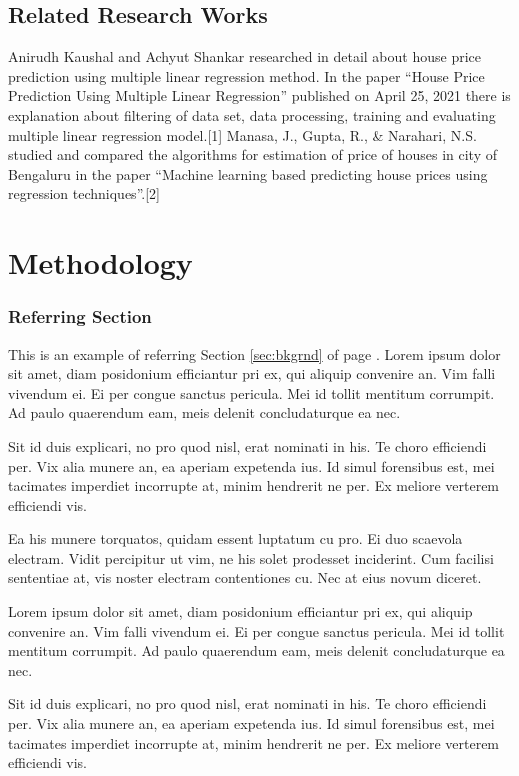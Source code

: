 \section{Related Research Works}
Anirudh Kaushal and Achyut Shankar researched in detail about house price prediction using multiple linear regression method. In the paper “House Price Prediction Using Multiple Linear Regression” published on April 25, 2021 there is explanation about filtering of data set, data processing, training and evaluating multiple linear regression model.[1]
Manasa, J., Gupta, R., \& Narahari, N.S. studied and compared the algorithms for estimation of price of houses in city of Bengaluru in the paper “Machine learning based predicting house prices using regression techniques”.[2]
\chapter{Methodology}

\subsection{Referring Section}
This is an example of referring Section \ref{sec:bkgrnd} of page \pageref{sec:bkgrnd}. Lorem ipsum dolor sit  amet, diam posidonium efficiantur pri ex, qui aliquip convenire an. Vim falli vivendum ei. Ei per congue sanctus pericula. Mei id tollit mentitum corrumpit. Ad paulo quaerendum eam, meis delenit concludaturque ea nec.\par
Sit id duis explicari, no pro quod nisl, erat nominati in his. Te choro efficiendi per. Vix alia munere an, ea aperiam expetenda ius. Id simul forensibus est, mei tacimates imperdiet incorrupte at, minim hendrerit ne per. Ex meliore verterem efficiendi vis.

Ea his munere torquatos, quidam essent luptatum cu pro. Ei duo scaevola electram. Vidit percipitur ut vim, ne his solet prodesset inciderint. Cum facilisi sententiae at, vis noster electram contentiones cu. Nec at eius novum diceret.

Lorem ipsum dolor sit  amet, diam posidonium efficiantur pri ex, qui aliquip convenire an. Vim falli vivendum ei. Ei per congue sanctus pericula. Mei id tollit mentitum corrumpit. Ad paulo quaerendum eam, meis delenit concludaturque ea nec.\par
Sit id duis explicari, no pro quod nisl, erat nominati in his. Te choro efficiendi per. Vix alia munere an, ea aperiam expetenda ius. Id simul forensibus est, mei tacimates imperdiet incorrupte at, minim hendrerit ne per. Ex meliore verterem efficiendi vis.

